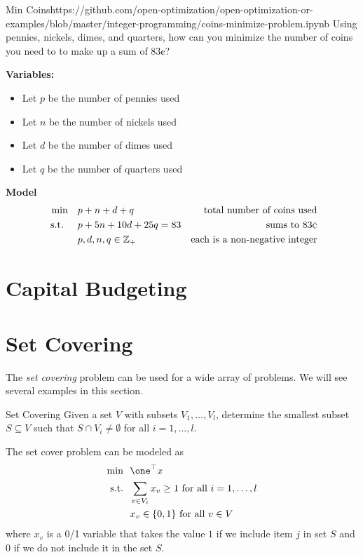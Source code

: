 \begin{examplewithcode}{Min Coins}{https://github.com/open-optimization/open-optimization-or-examples/blob/master/integer-programming/coins-minimize-problem.ipynb}
\label{ex:min-coins}
Using pennies, nickels, dimes, and quarters, how can you minimize the number of coins you need to to make up a sum of $83\cent$? 

\textbf{Variables:}
\begin{itemize}
\item Let $p$ be the number of pennies used
\item Let $n$ be the number of nickels used
\item Let $d$ be the number of dimes used
\item Let $q$ be the number of quarters used
\end{itemize}
\textbf{Model}
\begin{align*}
\min \quad & p + n + d + q & \text{ total number of coins used}\\
\text{ s.t. } \quad & p + 5n + 10d + 25 q = 83 & \text{sums to } 83 \cent\\
& p,d,n,q \in \Z_+ & \text{each is a non-negative integer}
\end{align*}
\end{examplewithcode}

\section{Capital Budgeting}
\todoSection{}





\section{Set Covering}
\todoSection{}

The \emph{set covering} problem can be used for a wide array of problems.    We will see several examples in this section.

\begin{general}{Set Covering}{\npcomplete}
\label{general:set-covering}
Given a set $V$ with subsets $V_1, \dots, V_l$, determine the smallest subset $S \subseteq V$ such that 
$S \cap V_i \neq \emptyset$ for all $i=1, \dots, l$.

The set cover problem can be modeled as
\begin{equation}
\begin{split}
\min \ \ & \one^\top x\\
\text{s.t.} \ \ & \sum_{v \in V_i} x_v \geq 1 \text{ for all } i =1, \dots, l \\ 
& x_v \in \{0,1\} \text{ for all } v \in V
\end{split}
\end{equation}
where $x_v$ is a 0/1 variable that takes the value $1$ if we include item $j$ in set $S$ and $0$ if we do not include it in the set $S$.  
\end{general}



